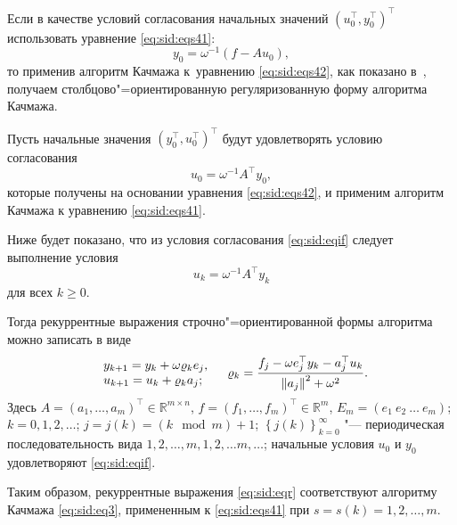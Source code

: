 Если в качестве условий согласования начальных значений $ \left(u^\top_0, y^\top_0 \right)^\top$ использовать уравнение \eqref{eq:sid:eqs41}: 
\begin{equation*}
y_0=\omega^{-1}\left(f-Au_0\right),
\end{equation*}
то применив алгоритм Качмажа к~уравнению \eqref{eq:sid:eqs42}, как показано в~\cite{zhdanovsid:bib:Ivanov}, получаем столбцово"=ориентированную регуляризованную форму алгоритма Качмажа.

Пусть начальные значения $\left(y^\top_0,u^\top_0\right)^\top$ будут удовлетворять условию согласования
\begin{equation}
\label{eq:sid:eqif}
u_0 = \omega^{-1}A^\top y_0,
\end{equation}
которые получены на основании уравнения \eqref{eq:sid:eqs42}, и применим алгоритм Качмажа к уравнению \eqref{eq:sid:eqs41}.

Ниже будет показано, что из условия согласования \eqref{eq:sid:eqif} следует выполнение условия
\begin{equation}
\label{eq:sid:eqt1}
u_k=\omega^{-1}A^\top y_k
\end{equation}
для всех $k \geq 0$.

Тогда рекуррентные выражения строчно"=ориентированной формы алгоритма можно записать в виде
\begin{equation}
\label{eq:sid:eqr}
\begin{tabular}{l}
$y_{k+1}=y_k+\omega \varrho_k e_j$,\\
$u_{k+1}=u_k+\varrho_k a_j$;\\
\end{tabular}\quad 
\varrho_k = \frac{f_j-\omega e^\top _j y_k-a^\top _ju_k}{\left\Vert a_j\right\Vert^2+\omega^2}.
\end{equation}
Здесь $A=( a _1, \dots, a _m)^\top\in\mathbb{R}^{m\times n}$, 
$f = (f_1, \dots, f_m )^\top  \in \mathbb{R}^m$, 
$E_m= (e_1 \: e_2 \:  \dots \:e_m )$; 
$k = 0, 1, 2, \dots$; 
$j=j(k)=\left(k  \mod  m\right)+1$; 
$\left\lbrace j\left(k\right) \right\rbrace ^{\infty}_{k=0}$ "--- периодическая последовательность вида 
$1, 2, \dots, m, 1, 2,  \dots m, \dots$; начальные условия $u_0$ и $y_0$ удовлетворяют \eqref{eq:sid:eqif}.

Таким образом, рекуррентные выражения \eqref{eq:sid:eqr} соответствуют алгоритму Качмажа \eqref{eq:sid:eq3}, примененным к \eqref{eq:sid:eqs41} при $s=s\left(k\right) = 1, 2, \dots,  m$. 

\smallskip

